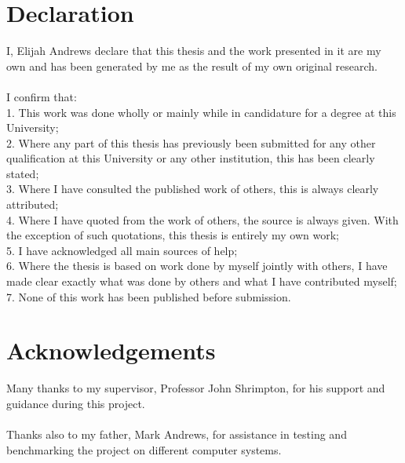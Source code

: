 \documentclass[a4paper,11pt,titlepage]{report}
\begin{document}
\chapter*{Declaration}
I, Elijah Andrews declare that this thesis and the work presented in it are my own and has
been generated by me as the result of my own original research.
\\\\I confirm that:
\\1. This work was done wholly or mainly while in candidature for a degree at this University;
\\2. Where any part of this thesis has previously been submitted for any other qualification at this University or any other institution, this has been clearly stated;
\\3. Where I have consulted the published work of others, this is always clearly attributed;
\\4. Where I have quoted from the work of others, the source is always given. With the exception of such quotations, this thesis is entirely my own work;
\\5. I have acknowledged all main sources of help;
\\6. Where the thesis is based on work done by myself jointly with others, I have made clear exactly what was done by others and what I have contributed myself;
\\7. None of this work has been published before submission.
\chapter*{Acknowledgements}
Many thanks to my supervisor, Professor John Shrimpton, for his support and guidance during this project.
\\\\Thanks also to my father, Mark Andrews, for assistance in testing and benchmarking the project on different computer systems.
\tableofcontents
\end{document}
